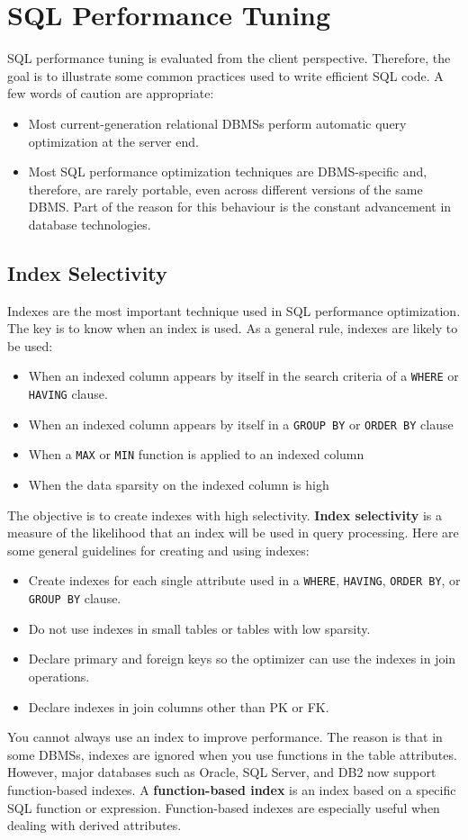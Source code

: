 \documentclass[a4paper, 11pt, titlepage]{report}
\begin{document}
\section{SQL Performance Tuning}
SQL performance tuning is evaluated from the client perspective. Therefore, the goal is
to illustrate some common practices used to write efficient SQL code. A few words of
caution are appropriate:
\begin{itemize}
\item Most current-generation relational DBMSs perform automatic query optimization at the server end.
\item Most SQL performance optimization techniques are DBMS-specific and, therefore, are rarely portable, even across different versions of the same DBMS. Part of the reason for this behaviour is the constant advancement in database technologies.
\end{itemize}
\subsection{Index Selectivity}
Indexes are the most important technique used in SQL performance optimization. The key is to know when an index is used. As a general rule, indexes are likely to be used:
\begin{itemize}
\item When an indexed column appears by itself in the search criteria of a \texttt{WHERE} or \texttt{HAVING} clause.
\item When an indexed column appears by itself in a \texttt{GROUP BY} or \texttt{ORDER BY} clause
\item When a \texttt{MAX} or \texttt{MIN} function is applied to an indexed column
\item When the data sparsity on the indexed column is high
\end{itemize}
The objective is to create indexes with high selectivity. \textbf{Index selectivity} is a measure of the likelihood that an index will be used in query processing. Here are some general guidelines for creating and using indexes:
\begin{itemize}
\item Create indexes for each single attribute used in a \texttt{WHERE}, \texttt{HAVING}, \texttt{ORDER BY}, or \texttt{GROUP BY} clause.
\item Do not use indexes in small tables or tables with low sparsity.
\item Declare primary and foreign keys so the optimizer can use the indexes in join operations.
\item Declare indexes in join columns other than PK or FK.
\end{itemize}
You cannot always use an index to improve performance. The reason is that in some DBMSs, indexes are ignored when you use functions in the table attributes. However, major databases such as Oracle, SQL Server, and DB2 now support function-based indexes. A \textbf{function-based index} is an index based on a specific SQL function or expression. Function-based indexes are especially useful when dealing with derived attributes.
\end{document}
